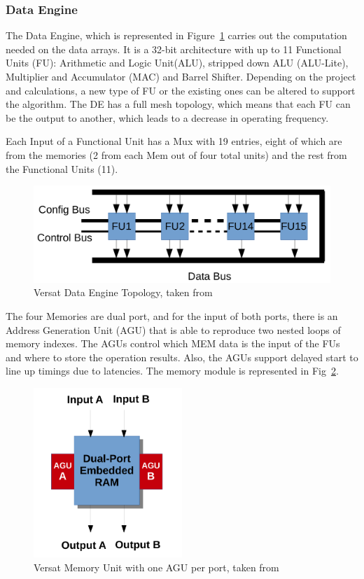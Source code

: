 \subsubsection{Data Engine}
\quad The Data Engine, which is represented in Figure~\ref{figure:DE} carries out the computation needed on the data arrays. It is a 32-bit architecture with up to 11 Functional Units (FU):
 Arithmetic and Logic Unit(ALU), stripped down ALU (ALU-Lite),
 Multiplier and Accumulator (MAC) and Barrel Shifter.
 Depending on the project and calculations, a new type of FU or the existing ones can be altered to support the algorithm.
 The DE has a full mesh topology, which means that each FU can be the output to another, which leads to a decrease in operating frequency.

 Each Input of a Functional Unit has a Mux with 19 entries, eight of which are from the memories (2 from each Mem out of four total units) and the rest from the Functional Units (11).

 \begin{figure}[!htbp]
    \centering
    \includegraphics[width=1\textwidth]{Figures/de.png}
    \caption{Versat Data Engine Topology, taken from~\cite{sousa:FFT}}
    \label{figure:DE}
\end{figure} 

 The four Memories are dual port, and for the input of both ports, 
 there is an Address Generation Unit (AGU) that is able to 
 reproduce two nested loops of memory indexes.
 The AGUs control which MEM data is the input of the FUs and where
 to store the operation results. Also, the AGUs support delayed start to line up timings
due to latencies. The memory module is represented in Fig~\ref{figure:FU}.

\begin{figure}[!htbp]
    \centering
    \includegraphics[width=0.5\textwidth]{Figures/fu2.pdf}
    \caption{Versat Memory Unit with one AGU per port, taken from~\cite{lopes:Versat}}
    \label{figure:FU}
\end{figure} 

